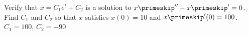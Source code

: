 {Verify that $x=C_1e^t+C_2$ is a solution to $x\primeskip''-x\primeskip' = 0$.  Find $C_1$ and
$C_2$ so that $x$ satisfies $x(0) = 10$ and $x\primeskip'(0) = 100$.}
{$C_1 = 100$, $C_2 = -90$}